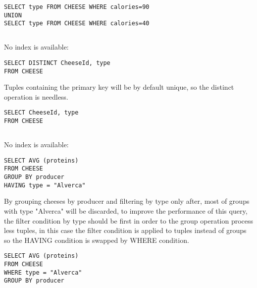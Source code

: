 \begin{lstlisting}
SELECT type	FROM CHEESE	WHERE calories=90
UNION
SELECT type	FROM CHEESE	WHERE calories=40
\end{lstlisting}

{\color{gray}\subsection{} No index is available:}

\begin{lstlisting}
SELECT DISTINCT CheeseId, type
FROM CHEESE 
\end{lstlisting}

Tuples containing the primary key will be by default unique, so the distinct operation is needless. 

\begin{lstlisting}
SELECT CheeseId, type
FROM CHEESE 
\end{lstlisting}

{\color{gray}\subsection{} No index is available:}

\begin{lstlisting}
SELECT AVG (proteins)
FROM CHEESE
GROUP BY producer
HAVING type = "Alverca"
\end{lstlisting}

By grouping cheeses by producer and filtering by type only after, most of groups with type "Alverca" will be discarded, to improve the performance of this query, the filter condition by type should be first in order to the group operation process less tuples, in this case the filter condition is applied to tuples instead of groups so the HAVING condition is swapped by WHERE condition.

\begin{lstlisting}
SELECT AVG (proteins)
FROM CHEESE
WHERE type = "Alverca"
GROUP BY producer
\end{lstlisting}



